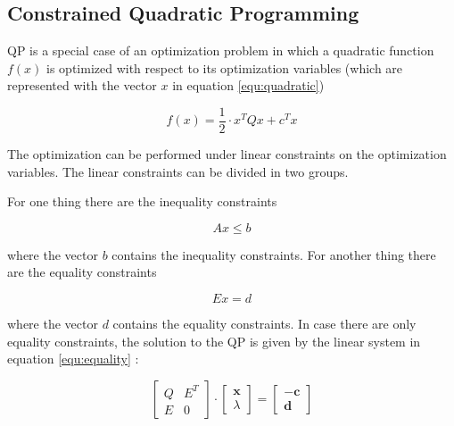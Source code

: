 \subsection{Constrained Quadratic Programming}

QP is a special case of an optimization problem in which a quadratic function $f(x)$ is optimized with respect to its optimization variables (which are represented with the vector $x$ in equation \ref{equ:quadratic})

\begin{equation}
 f(x)  = \frac{1}{2} \cdot x^T Q x + c^T x 
\label{equ:quadratic}
\end{equation}

The optimization can be performed under linear constraints on the optimization variables. The linear constraints can be divided in two groups. \newline

 For one thing there are the inequality constraints

\begin{equation}
A  x \leq b
\label{equ:inequalityConstraintsQP}
\end{equation}

where the vector $b$ contains the inequality constraints. For another thing there are the equality constraints

\begin{equation}
E  x = d
\end{equation}

where the vector $d$ contains the equality constraints. In case there are only equality constraints, the solution to the QP is given by the linear system in equation \ref{equ:equality} :





\begin{equation}
\begin{bmatrix}
   Q & E^T \\
   E & 0
\end{bmatrix} 
\cdot
\begin{bmatrix}
   \mathbf x \\
   \lambda
\end{bmatrix}
= 
\begin{bmatrix}
   -\mathbf c \\
   \mathbf d
\end{bmatrix}
\label{equ:equality}
\end{equation}


